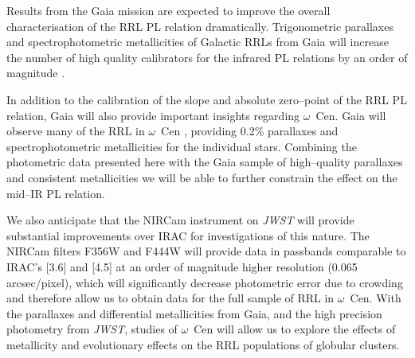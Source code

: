 \documentclass[a4paper,fleqn,usenatbib]{mnras}
\begin{document}
Results from the Gaia mission \citep{1996A&AS..116..579L} are expected to improve the overall characterisation of the RRL PL relation dramatically. Trigonometric parallaxes and spectrophotometric metallicities of Galactic RRLs from Gaia will increase the number of high quality calibrators for the infrared PL relations by an order of magnitude \citep[Scowcroft et al. 2016b, in prep., Beaton et al. 2016, in prep.]{2012MNRAS.426.2463L}. 

In addition to the calibration of the slope and absolute zero--point of the RRL PL relation, Gaia will also provide important insights regarding $\omega$~Cen. Gaia will observe many of the RRL in $\omega$~Cen \citep{2002ASPC..265..415B}, providing 0.2\% parallaxes and spectrophotometric metallicities for the individual stars. Combining the photometric data presented here with the Gaia sample of high--quality parallaxes and consistent metallicities we will be able to further constrain the effect on the mid--IR PL relation.

We also anticipate that the NIRCam instrument on {\em JWST} \citep{2005SPIE.5904...21B, 2006SSRv..123..485G} will provide substantial improvements over IRAC for investigations of this nature. The NIRCam filters F356W and F444W will provide data in passbands comparable to IRAC's [3.6] and [4.5] at an order of magnitude higher resolution (0.065 arcsec/pixel), which will significantly decrease photometric error due to crowding and therefore allow us to obtain data for the full sample of RRL in $\omega$~Cen. With the parallaxes and differential metallicities from Gaia, and the high precision photometry from {\it JWST}, studies of $\omega$~Cen will allow us to explore the effects of metallicity and evolutionary effects on the RRL populations of globular clusters. 





\end{document}
